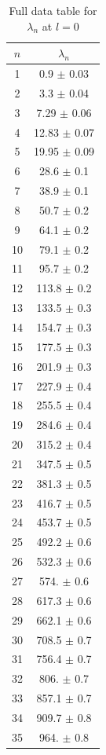 \documentclass[12pt,twoside]{reedthesis}
\begin{document}
\begin{table}[h]
\centering
	\caption{Full data table for $\lambda_n$ at $l = 0$}
	\label{tab:l0}
	\begin{tabular}{c|c}
		$n$	& $\lambda_n$\\
		\hline
		1	& 0.9 $\pm$ 0.03\\
		2	& 3.3 $\pm$ 0.04\\
		3	& 7.29 $\pm$ 0.06\\
		4	& 12.83 $\pm$ 0.07\\
		5	& 19.95 $\pm$ 0.09\\
		6	& 28.6 $\pm$ 0.1\\
		7	& 38.9 $\pm$ 0.1\\
		8	& 50.7 $\pm$ 0.2\\
		9	& 64.1 $\pm$ 0.2\\
		10	& 79.1 $\pm$ 0.2\\
		11	& 95.7 $\pm$ 0.2\\
		12	& 113.8 $\pm$ 0.2\\
		13	& 133.5 $\pm$ 0.3\\
		14	& 154.7 $\pm$ 0.3\\
		15	& 177.5 $\pm$ 0.3\\
		16	& 201.9 $\pm$ 0.3\\
		17	& 227.9 $\pm$ 0.4\\
		18	& 255.5 $\pm$ 0.4\\
		19	& 284.6 $\pm$ 0.4\\
		20	& 315.2 $\pm$ 0.4\\
		21	& 347.5 $\pm$ 0.5\\
		22	& 381.3 $\pm$ 0.5\\
		23	& 416.7 $\pm$ 0.5\\
		24	& 453.7 $\pm$ 0.5\\
		25	& 492.2 $\pm$ 0.6\\
		26	& 532.3 $\pm$ 0.6\\
		27	& 574. $\pm$ 0.6\\
		28	& 617.3 $\pm$ 0.6\\
		29	& 662.1 $\pm$ 0.6\\
		30	& 708.5 $\pm$ 0.7\\
		31	& 756.4 $\pm$ 0.7\\
		32	& 806. $\pm$ 0.7\\
		33	& 857.1 $\pm$ 0.7\\
		34	& 909.7 $\pm$ 0.8\\
		35	& 964. $\pm$ 0.8
	\end{tabular}
\end{table}
\end{document}
